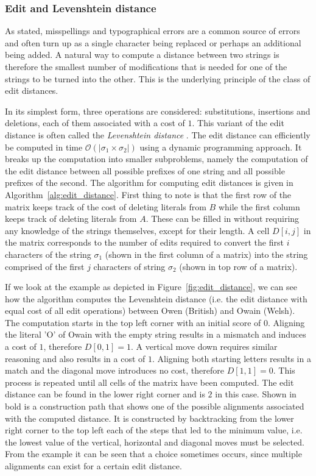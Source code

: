 \documentclass[paper=a4, fontsize=11pt]{scrartcl}
\begin{document}
\subsubsection{Edit and Levenshtein distance}
As stated, misspellings and typographical errors are a common source of errors and often turn up as a single character being replaced or perhaps an additional being added.
A natural way to compute a distance between two strings is therefore the smallest number of modifications that is needed for one of the strings to be turned into the other.
This is the underlying principle of the class of edit distances.

In its simplest form, three operations are considered: substitutions, insertions and deletions, each of them associated with a cost of $1$.
This variant of the edit distance is often called the \emph{Levenshtein distance} .
The edit distance can efficiently be computed in time $\mathcal{O}(\vert \sigma_1 \times \sigma_2 \vert)$ using a dynamic programming approach.
It breaks up the computation into smaller subproblems, namely the computation of the edit distance between all possible prefixes of one string and all possible prefixes of the second.
The algorithm for computing edit distances is given in Algorithm~\ref{alg:edit_distance}.
First thing to note is that the first row of the matrix keeps track of the cost of deleting literals from $B$ while the first column keeps track of deleting literals from $A$.
These can be filled in without requiring any knowledge of the strings themselves, except for their length.
A cell $D[i,j]$ in the matrix corresponds to the number of edits required to convert the first $i$ characters of the string $\sigma_1$ (shown in the first column of a matrix) into the string comprised of the first $j$ characters of string $\sigma_2$ (shown in top row of a matrix).\cite{christen12}

If we look at the example as depicted in Figure~\ref{fig:edit_distance}, we can see how the algorithm computes the Levenshtein distance (i.e. the edit distance with equal cost of all edit operations) between Owen (British) and Owain (Welsh).
The computation starts in the top left corner with an initial score of $0$.
Aligning the literal 'O' of Owain with the empty string results in a mismatch and induces a cost of $1$, therefore $D[0, 1]=1$.
A vertical move down requires similar reasoning and also results in a cost of $1$.
Aligning both starting letters results in a match and the diagonal move introduces no cost, therefore $D[1, 1]=0$.
This process is repeated until all cells of the matrix have been computed.
The edit distance can be found in the lower right corner and is $2$ in this case.
Shown in bold is a construction path that shows one of the possible alignments associated with the computed distance.
It is constructed by backtracking from the lower right corner to the top left each of the steps that led to the minimum value, i.e. the lowest value of the vertical, horizontal and diagonal moves must be selected.
From the example it can be seen that a choice sometimes occurs, since multiple alignments can exist for a certain edit distance.
\end{document}
